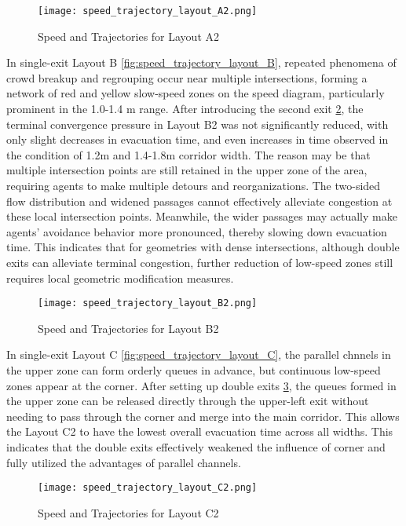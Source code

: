 \begin{figure}[h]
    \texttt{[image: speed\_trajectory\_layout\_A2.png]}
    \caption{Speed and Trajectories for Layout A2}\label{fig:speed_trajectory_layout_A2}
\end{figure}

In single-exit Layout B \ref{fig:speed_trajectory_layout_B}, repeated phenomena of crowd breakup and regrouping occur near multiple intersections, forming a network of red and yellow slow-speed zones on the speed diagram, particularly prominent in the 1.0-1.4 m range. After introducing the second exit \ref{fig:speed_trajectory_layout_B2}, the terminal convergence pressure in Layout B2 was not significantly reduced, with only slight decreases in evacuation time, and even increases in time observed in the condition of 1.2m and 1.4-1.8m corridor width. The reason may be that multiple intersection points are still retained in the upper zone of the area, requiring agents to make multiple detours and reorganizations. The two-sided flow distribution and widened passages cannot effectively alleviate congestion at these local intersection points. Meanwhile, the wider passages may actually make agents' avoidance behavior more pronounced, thereby slowing down evacuation time. This indicates that for geometries with dense intersections, although double exits can alleviate terminal congestion, further reduction of low-speed zones still requires local geometric modification measures.

\begin{figure}[h]
    \texttt{[image: speed\_trajectory\_layout\_B2.png]}
    \caption{Speed and Trajectories for Layout B2}\label{fig:speed_trajectory_layout_B2}
\end{figure}

In single-exit Layout C \ref{fig:speed_trajectory_layout_C}, the parallel chnnels in the upper zone can form orderly queues in advance, but continuous low-speed zones appear at the corner. After setting up double exits \ref{fig:speed_trajectory_layout_C2}, the queues formed in the upper zone can be released directly through the upper-left exit without needing to pass through the corner and merge into the main corridor. This allows the Layout C2 to have the lowest overall evacuation time across all widths. This indicates that the double exits effectively weakened the influence of corner and fully utilized the advantages of parallel channels.

\begin{figure}[h]
    \texttt{[image: speed\_trajectory\_layout\_C2.png]}
    \caption{Speed and Trajectories for Layout C2}\label{fig:speed_trajectory_layout_C2}
\end{figure}

